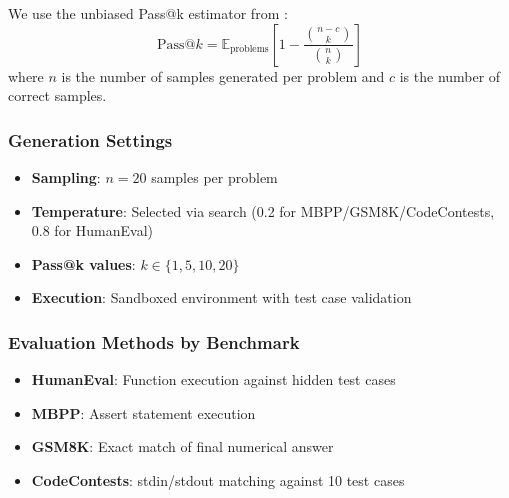 We use the unbiased Pass@k estimator from \citet{chen2021evaluating}:
\begin{equation}
    \text{Pass@}k = \mathbb{E}_{\text{problems}} \left[ 1 - \frac{\binom{n-c}{k}}{\binom{n}{k}} \right]
\end{equation}
where $n$ is the number of samples generated per problem and $c$ is the number of correct samples.

\subsubsection{Generation Settings}

\begin{itemize}[nosep]
    \item \textbf{Sampling}: $n=20$ samples per problem
    \item \textbf{Temperature}: Selected via search (0.2 for MBPP/GSM8K/CodeContests, 0.8 for HumanEval)
    \item \textbf{Pass@k values}: $k \in \{1, 5, 10, 20\}$
    \item \textbf{Execution}: Sandboxed environment with test case validation
\end{itemize}

\subsubsection{Evaluation Methods by Benchmark}

\begin{itemize}[nosep]
    \item \textbf{HumanEval}: Function execution against hidden test cases
    \item \textbf{MBPP}: Assert statement execution
    \item \textbf{GSM8K}: Exact match of final numerical answer
    \item \textbf{CodeContests}: stdin/stdout matching against 10 test cases
\end{itemize}
